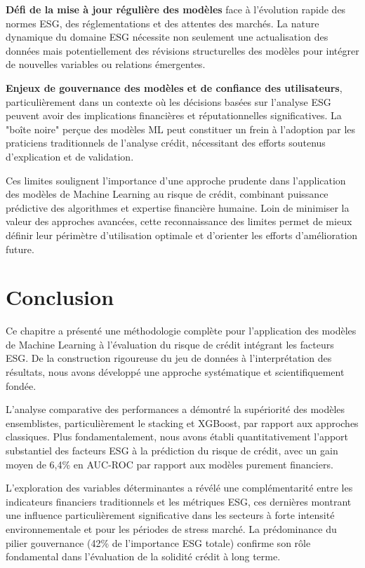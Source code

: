 \textbf{Défi de la mise à jour régulière des modèles} face à l'évolution rapide des normes ESG, des réglementations et des attentes des marchés. La nature dynamique du domaine ESG nécessite non seulement une actualisation des données mais potentiellement des révisions structurelles des modèles pour intégrer de nouvelles variables ou relations émergentes.

\textbf{Enjeux de gouvernance des modèles et de confiance des utilisateurs}, particulièrement dans un contexte où les décisions basées sur l'analyse ESG peuvent avoir des implications financières et réputationnelles significatives. La "boîte noire" perçue des modèles ML peut constituer un frein à l'adoption par les praticiens traditionnels de l'analyse crédit, nécessitant des efforts soutenus d'explication et de validation.

Ces limites soulignent l'importance d'une approche prudente dans l'application des modèles de Machine Learning au risque de crédit, combinant puissance prédictive des algorithmes et expertise financière humaine. Loin de minimiser la valeur des approches avancées, cette reconnaissance des limites permet de mieux définir leur périmètre d'utilisation optimale et d'orienter les efforts d'amélioration future.

\section*{Conclusion}

Ce chapitre a présenté une méthodologie complète pour l'application des modèles de Machine Learning à l'évaluation du risque de crédit intégrant les facteurs ESG. De la construction rigoureuse du jeu de données à l'interprétation des résultats, nous avons développé une approche systématique et scientifiquement fondée.

L'analyse comparative des performances a démontré la supériorité des modèles ensemblistes, particulièrement le stacking et XGBoost, par rapport aux approches classiques. Plus fondamentalement, nous avons établi quantitativement l'apport substantiel des facteurs ESG à la prédiction du risque de crédit, avec un gain moyen de 6,4\% en AUC-ROC par rapport aux modèles purement financiers.

L'exploration des variables déterminantes a révélé une complémentarité entre les indicateurs financiers traditionnels et les métriques ESG, ces dernières montrant une influence particulièrement significative dans les secteurs à forte intensité environnementale et pour les périodes de stress marché. La prédominance du pilier gouvernance (42\% de l'importance ESG totale) confirme son rôle fondamental dans l'évaluation de la solidité crédit à long terme.


